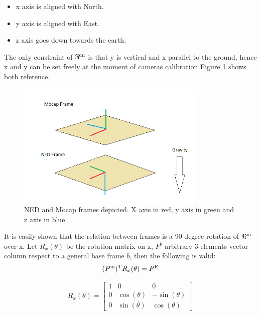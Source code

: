 \begin{itemize}
\item x axis is aligned with North.
\item y axis is aligned with East.
\item z axis goes down towards the earth.
\end{itemize}

\noindent
The only constraint of $\Re\textsuperscript{m}$ is that y is vertical and x parallel to the ground, hence x and y can be set freely at the moment of cameras calibration Figure \ref{figure:frames} shows both reference.

\begin{figure}[h]
\centering
 \includegraphics[width=0.8\textwidth]{frames.png}
 \caption[NED and Mocap frames]{NED and Mocap frames depicted. X axis in red, y axis in green and z axis in blue}
 \label{figure:frames}
\end{figure}

It is easily shown that the relation between frames is a 90 degree rotation of $\Re\textsuperscript{m}$ over x. Let $R_x(\theta)$ be the rotation matrix on x, $P^b$ arbitrary  3-elements vector column respect to a general base frame $b$, then the following is valid:
\begin{equation}
(P\textsuperscript{m})\textsuperscript{T}R_x(\theta) = P\textsuperscript{E}
\label{eq:adaptframe}
\end{equation}

\begin{equation}
R_x(\theta) = \begin{bmatrix} 1 & 0            & 0 \\
							  0 & \cos(\theta) & -\sin(\theta)\\
                              0 & \sin(\theta) &  \cos(\theta) 
\end{bmatrix}
\label{eq:rotx}
\end{equation}

